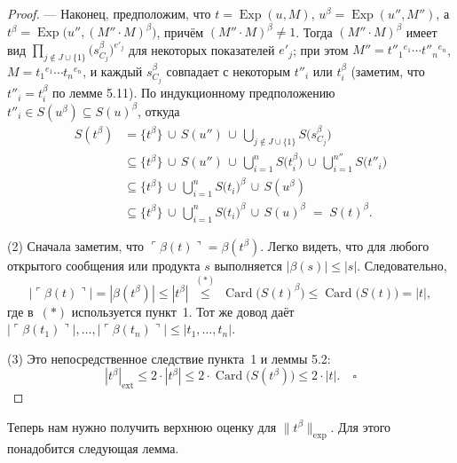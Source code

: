 \begin{proof}
— Наконец, предположим, что
   \(t=\operatorname{Exp}(u,M)\),
   \(u^{\beta}=\operatorname{Exp}(u'',M'')\),
   а
   \(t^{\beta}=\operatorname{Exp}\!\bigl(u'',(M''\!\cdot M)^{\beta}\bigr)\),
   причём \((M''\!\cdot M)^{\beta}\neq1\).
   Тогда \((M''\!\cdot M)^{\beta}\) имеет вид
   \(\prod_{j\notin J\cup\{1\}}\bigl(s_{C_{j}}^{\beta}\bigr)^{e'_{j}}\)
   для некоторых показателей \(e'_{j}\); при этом
   \(M''=t''_{1}{}^{e_{1}}\!\cdots t''_{n}{}^{e_{n}}\),
   \(M=t_{1}{}^{e_{1}}\!\cdots t_{n}{}^{e_{n}}\),
   и каждый \(s_{C_{j}}^{\beta}\) совпадает с некоторым
   \(t''_{i}\) или \(t_{i}^{\beta}\)
   (заметим, что \(t''_{i}=t_{i}^{\beta}\) по лемме 5.11).
   По индукционному предположению
   \(t''_{i}\in S(u^{\beta})\subseteq S(u)^{\beta}\), откуда
\[
\begin{aligned}
S(t^{\beta})
  &= \{t^{\beta}\}\,\cup\,S(u'')\,
     \cup\,\bigcup_{j\notin J\cup\{1\}} S\!\bigl(s_{C_j}^{\beta}\bigr)\\
  &\subseteq \{t^{\beta}\}\,\cup\,S(u'')\,
     \cup\,\bigcup_{i=1}^{n} S\!\bigl(t_{i}^{\beta}\bigr)\,
     \cup\,\bigcup_{i=1}^{n''} S\!\bigl(t''_{i}\bigr)\\
  &\subseteq \{t^{\beta}\}\,\cup\,\bigcup_{i=1}^{n} S\!\bigl(t_{i}\bigr)^{\beta}\,
     \cup\,S(u^{\beta})\\
  &\subseteq \{t^{\beta}\}\,\cup\,\bigcup_{i=1}^{n} S\!\bigl(t_{i}\bigr)^{\beta}\,
     \cup\,S(u)^{\beta}
  \;=\; S(t)^{\beta}.
\end{aligned}
\]

(2)\; Сначала заметим, что $\ulcorner\beta(t)\urcorner=\beta(t^{\beta})$.
Легко видеть, что для любого открытого сообщения или продукта $s$
выполняется $|\beta(s)|\le |s|$.
Следовательно,
\[
  |\ulcorner\beta(t)\urcorner|
     =|\beta(t^{\beta})|
     \le |t^{\beta}|
     \;\overset{(*)}{\le}\;
     \operatorname{Card}\bigl(S(t)^{\beta}\bigr)
     \le \operatorname{Card}\bigl(S(t)\bigr)
     =|t|,
\]
где в~$(*)$ используется пункт~1. 
Тот же довод даёт
$|\ulcorner\beta(t_{1})\urcorner|,\dots,
 |\ulcorner\beta(t_{n})\urcorner|
 \le |t_{1},\dots,t_{n}|$.

\smallskip
(3)\; Это непосредственное следствие пункта~1 и леммы 5.2:
\[
  |t^{\beta}|_{\text{ext}}
     \le 2\cdot|t^{\beta}|
     \le 2\cdot\operatorname{Card}\bigl(S(t^{\beta})\bigr)
     \le 2\cdot|t|.
\quad\square
\]
\end{proof}

Теперь нам нужно получить верхнюю оценку для
$\lVert t^{\beta}\rVert_{\text{exp}}$.
Для этого понадобится следующая лемма.

